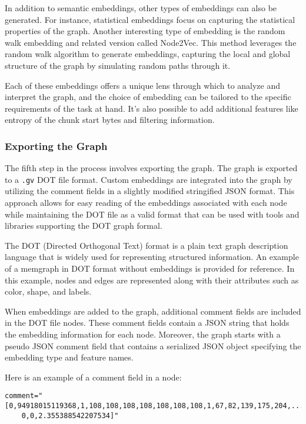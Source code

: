 In addition to semantic embeddings, other types of embeddings can also be generated. For instance, statistical embeddings focus on capturing the statistical properties of the graph. Another interesting type of embedding is the random walk embedding and related version called Node2Vec. This method leverages the random walk algorithm to generate embeddings, capturing the local and global structure of the graph by simulating random paths through it.

Each of these embeddings offers a unique lens through which to analyze and interpret the graph, and the choice of embedding can be tailored to the specific requirements of the task at hand. It's also possible to add additional features like entropy of the chunk start bytes and filtering information.

\subsubsection{Exporting the Graph}

The fifth step in the process involves exporting the graph. The graph is exported to a \texttt{.gv} DOT file format. Custom embeddings are integrated into the graph by utilizing the comment fields in a slightly modified stringified JSON format. This approach allows for easy reading of the embeddings associated with each node while maintaining the DOT file as a valid format that can be used with tools and libraries supporting the DOT graph formal.

The DOT (Directed Orthogonal Text) format is a plain text graph description language that is widely used for representing structured information. An example of a \gls{memgraph} in DOT format without embeddings is provided for reference. In this example, nodes and edges are represented along with their attributes such as color, shape, and labels.

When embeddings are added to the graph, additional comment fields are included in the DOT file nodes. These comment fields contain a JSON string that holds the embedding information for each node. Moreover, the graph starts with a pseudo JSON comment field that contains a serialized JSON object specifying the embedding type and feature names. 

Here is an example of a comment field in a node:

\begin{lstlisting}[style=text, caption={A comment field example for a node with embedding. Output is cropped.}]
    comment="[0,94918015119368,1,108,108,108,108,108,108,108,1,67,82,139,175,204,...
    0,0,2.355388542207534]"
\end{lstlisting}

